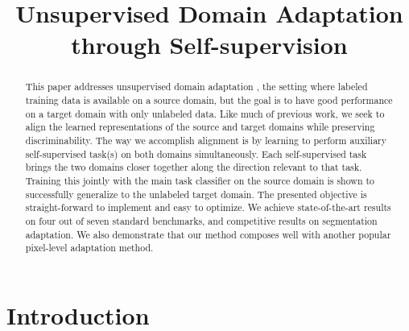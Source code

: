 \documentclass[conference]{IEEEtran}
\begin{document}
\title{Unsupervised Domain Adaptation through Self-supervision}

\author{
}

\maketitle

\begin{abstract}
This paper addresses unsupervised domain adaptation \cite{b1}, the setting where labeled training data is available on a source domain, but the goal is to have good performance on a target domain with only unlabeled data.
Like much of previous work, we seek to align the learned representations of the source and target domains while preserving discriminability.
The way we accomplish alignment is by learning to perform auxiliary self-supervised task(s) on both domains simultaneously.
Each self-supervised task brings the two domains closer together along the direction relevant to that task.
Training this jointly with the main task classifier on the source domain is shown to successfully generalize to the unlabeled target domain.
The presented objective is straight-forward to implement and easy to optimize. We achieve state-of-the-art results on four out of seven standard benchmarks, and competitive results on segmentation adaptation.
We also demonstrate that our method composes well with another popular pixel-level adaptation method.
\end{abstract}

\section{Introduction}







\end{document}
